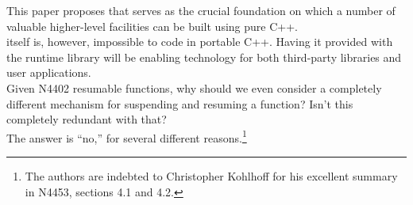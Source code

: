 This paper proposes \ectx that serves as the crucial foundation on which a
number of valuable higher-level facilities can be built using pure C++.\\
\newline
\ectx itself is, however, impossible to code in portable C++. Having it provided
with the runtime library will be enabling technology for both third-party
libraries and user applications.\\

Given N4402 resumable functions, why should we even consider a completely
different mechanism for suspending and resuming a function? Isn't this
completely redundant with that?\\
\newline
The answer is ``no,'' for several different reasons.\footnote{The authors are
indebted to Christopher Kohlhoff for his excellent summary in
N4453,\cite{N4453} sections 4.1 and 4.2.}

